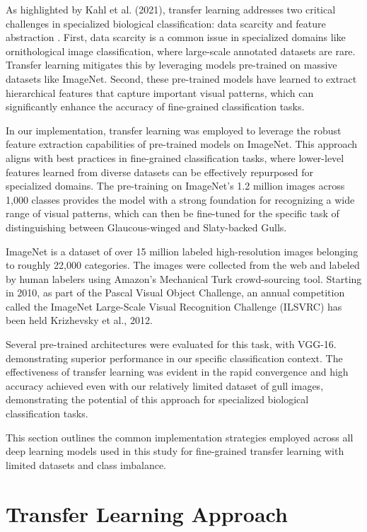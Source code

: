 \documentclass[a4paper,12pt]{article}
\begin{document}
As highlighted by Kahl et al. (2021), transfer learning addresses two critical challenges in specialized biological classification: data scarcity and feature abstraction \citet{kahl2021}. First, data scarcity is a common issue in specialized domains like ornithological image classification, where large-scale annotated datasets are rare. Transfer learning mitigates this by leveraging models pre-trained on massive datasets like ImageNet. Second, these pre-trained models have learned to extract hierarchical features that capture important visual patterns, which can significantly enhance the accuracy of fine-grained classification tasks.

In our implementation, transfer learning was employed to leverage the robust feature extraction capabilities of pre-trained models on ImageNet. This approach aligns with best practices in fine-grained classification tasks, where lower-level features learned from diverse datasets can be effectively repurposed for specialized domains. The pre-training on ImageNet's 1.2 million images across 1,000 classes provides the model with a strong foundation for recognizing a wide range of visual patterns, which can then be fine-tuned for the specific task of distinguishing between Glaucous-winged and Slaty-backed Gulls.

ImageNet is a dataset of over 15 million labeled high-resolution images belonging to roughly 22,000
categories. The images were collected from the web and labeled by human labelers using Amazon’s Mechanical Turk crowd-sourcing tool. Starting in 2010, as part of the Pascal Visual Object
Challenge, an annual competition called the ImageNet Large-Scale Visual Recognition Challenge
(ILSVRC) has been held {Krizhevsky et al., 2012}.

Several pre-trained architectures were evaluated for this task, with VGG-16. \citet{simonyan2014vgg} demonstrating superior performance in our specific classification context. The effectiveness of transfer learning was evident in the rapid convergence and high accuracy achieved even with our relatively limited dataset of gull images, demonstrating the potential of this approach for specialized biological classification tasks.



This section outlines the common implementation strategies employed across all deep learning models used in this study for fine-grained transfer learning with limited datasets and class imbalance.

\section{Transfer Learning Approach}
\end{document}
